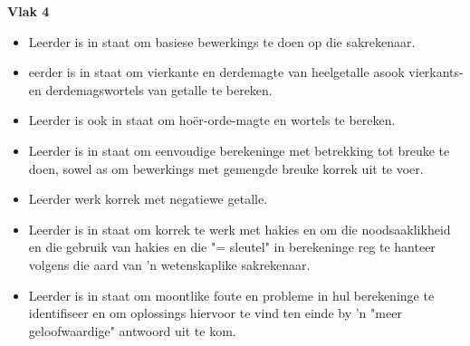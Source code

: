 \textbf{Vlak 4}\begin{itemize}[noitemsep]
\item
Leerder is in staat om basiese bewerkings te doen op die sakrekenaar.
\item
eerder is in staat om vierkante en derdemagte van heelgetalle asook vierkants-en derdemagswortels van getalle te bereken.
\item
Leerder is ook in staat om ho\"{e}r-orde-magte en wortels te bereken.
\item
Leerder is in staat om eenvoudige berekeninge met betrekking tot breuke te doen, sowel as om bewerkings met gemengde breuke korrek uit te voer.
\item
Leerder werk korrek met negatiewe getalle.
\item
Leerder is in staat om korrek te werk met hakies en om die noodsaaklikheid en die gebruik van hakies en die "= sleutel" in berekeninge reg te hanteer volgens die aard van 'n wetenskaplike sakrekenaar.
\item
Leerder is in staat om moontlike foute en probleme in hul berekeninge te identifiseer en om oplossings hiervoor te vind ten einde by 'n "meer geloofwaardige" antwoord uit te kom.
\end{itemize}

